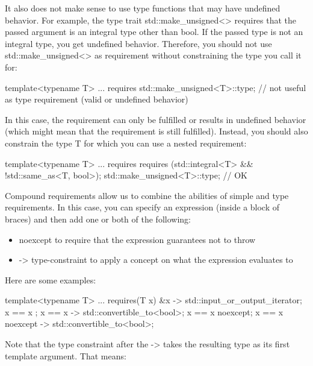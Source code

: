It also does not make sense to use type functions that may have undefined behavior. For example, the type trait std::make\_unsigned<> requires that the passed argument is an integral type other than bool. If the passed type is not an integral type, you get undefined behavior. Therefore, you should not use std::make\_unsigned<> as requirement without constraining the type you call it for:

\begin{cpp}
template<typename T>
... requires {
	std::make_unsigned<T>::type; // not useful as type requirement (valid or undefined behavior)
}
\end{cpp}

In this case, the requirement can only be fulfilled or results in undefined behavior (which might mean that the requirement is still fulfilled). Instead, you should also constrain the type T for which you can use a nested requirement:

\begin{cpp}
template<typename T>
... requires {
	requires (std::integral<T> && !std::same_as<T, bool>);
	std::make_unsigned<T>::type; // OK
}
\end{cpp}


Compound requirements allow us to combine the abilities of simple and type requirements. In this case, you can specify an expression (inside a block of braces) and then add one or both of the following:

\begin{itemize}
\item
noexcept to require that the expression guarantees not to throw

\item
-> type-constraint to apply a concept on what the expression evaluates to
\end{itemize}

Here are some examples:

\begin{cpp}
template<typename T>
... requires(T x) {
	{ &x } -> std::input_or_output_iterator;
	{ x == x };
	{ x == x } -> std::convertible_to<bool>;
	{ x == x }noexcept;
	{ x == x }noexcept -> std::convertible_to<bool>;
}
\end{cpp}

Note that the type constraint after the -> takes the resulting type as its first template argument. That means:

